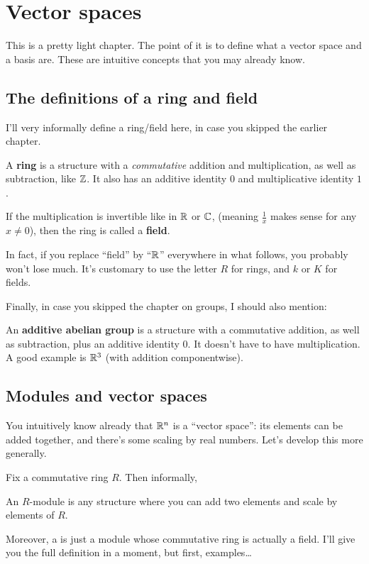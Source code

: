 \chapter{Vector spaces}
This is a pretty light chapter.
The point of it is to define what a vector space and a basis are.
These are intuitive concepts that you may already know.

\section{The definitions of a ring and field}

I'll very informally define a ring/field here,
in case you skipped the earlier chapter.
\begin{itemize}
	\ii A \textbf{ring} is a structure with a \emph{commutative}
	addition and multiplication, as well as subtraction, like $\mathbb Z$.
	It also has an additive identity $0$ and multiplicative identity $1$.

	\ii If the multiplication is invertible like in $\mathbb R$ or $\mathbb C$,
	(meaning $\frac 1x$ makes sense for any $x \neq 0$),
	then the ring is called a \textbf{field}.
\end{itemize}
In fact, if you replace ``field'' by ``$\mathbb R$'' everywhere in what follows,
you probably won't lose much.
It's customary to use the letter $R$ for rings, and $k$ or $K$ for fields.

Finally, in case you skipped the chapter on groups, I should also mention:
\begin{itemize}
	\ii An \textbf{additive abelian group} is a structure
	with a commutative addition, as well as subtraction,
	plus an additive identity $0$.
	It doesn't have to have multiplication.
	A good example is $\mathbb R^3$ (with addition componentwise).
\end{itemize}

\section{Modules and vector spaces}
You intuitively know already that $\mathbb R^n$ is a ``vector space'':
its elements can be added together,
and there's some scaling by real numbers.
Let's develop this more generally.

Fix a commutative ring $R$.
Then informally,
\begin{moral}
	An $R$-module is any structure where you can add two elements
	and scale by elements of $R$.
\end{moral}
Moreover, a  is just a module whose commutative ring
is actually a field.
I'll give you the full definition in a moment,
but first, examples\dots

